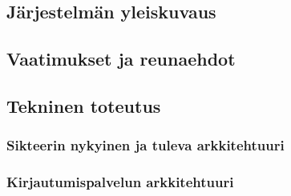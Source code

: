 
\subsection{Järjestelmän yleiskuvaus}

\subsection{Vaatimukset ja reunaehdot}

\subsection{Tekninen toteutus}

\subsubsection{Sikteerin nykyinen ja tuleva arkkitehtuuri}

\subsubsection{Kirjautumispalvelun arkkitehtuuri}
